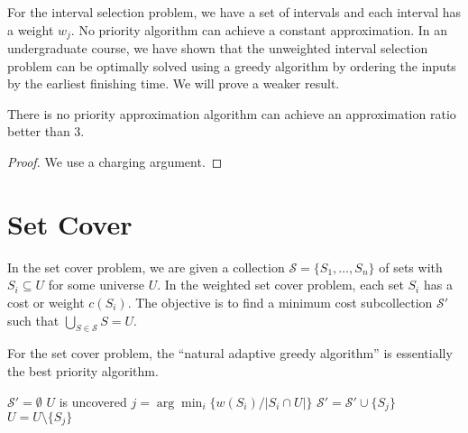 For the interval selection problem, we have a set of intervals and each interval has a weight $w_j$. No priority algorithm can achieve a constant approximation. In an undergraduate course, we have shown that the unweighted interval selection problem can be optimally solved using a greedy algorithm by ordering the inputs by the earliest finishing time. We will prove a weaker result.

\begin{theorem}
    There is no priority approximation algorithm can achieve an approximation ratio better than 3.
\end{theorem}
\begin{proof}
    We use a charging argument. 
\end{proof}

\section{Set Cover}

In the set cover problem, we are given a collection $\mathcal{S} = \{S_1,\ldots,S_n\}$ of sets with $S_i \subseteq U$ for some universe $U$. In the weighted set cover problem, each set $S_i$ has a cost or weight $c(S_i)$. The objective is to find a minimum cost subcollection $\mathcal{S}'$ such that $\bigcup_{S \in \mathcal{S}} S = U$.

For the set cover problem, the ``natural adaptive greedy algorithm'' is essentially the best priority algorithm.

\begin{codebox}
    \li $\mathcal{S}' = \emptyset$
    \li \While $U$ is uncovered \Do
        \li $j = \arg\min_{i} \{w(S_i) / |S_i \cap U|\}$
        \li $\mathcal{S}' = \mathcal{S}' \cup \{S_j\}$
        \li $U = U \setminus \{S_j\}$ 
\end{codebox}

